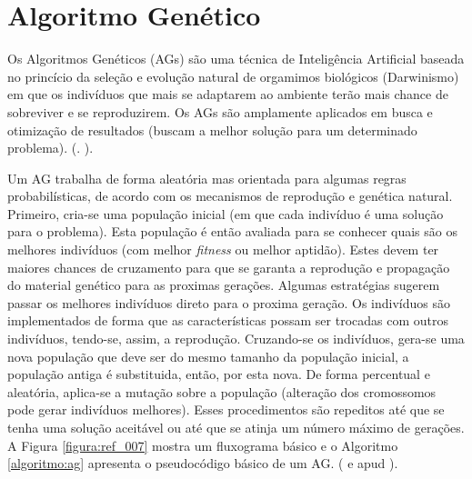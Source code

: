 \section{Algoritmo Genético}
\label{secao:AG}

Os Algoritmos Genéticos (AGs) são uma técnica de Inteligência Artificial baseada no princício da seleção e evolução natural de orgamimos biológicos (Darwinismo) em que os indivíduos que mais se adaptarem ao ambiente terão mais chance de sobreviver e se reproduzirem. Os AGs são amplamente aplicados em busca e otimização de resultados (buscam a melhor solução para um determinado problema). (\cite{pacheco:1999:algoritmos}. \cite{silva:2001:otimizacao}). 

Um AG trabalha de forma aleatória mas orientada para algumas regras probabilísticas, de acordo com os mecanismos de reprodução e genética natural. Primeiro, cria-se uma população inicial (em que cada indivíduo é uma solução para o problema). Esta população é então avaliada para se conhecer quais são os melhores indivíduos (com melhor \textit{fitness} ou melhor aptidão). Estes devem ter maiores chances de cruzamento para que se garanta a reprodução e propagação do material genético para as proximas gerações. Algumas estratégias sugerem passar os melhores indivíduos direto para o proxima geração. Os indivíduos são implementados de forma que as características possam ser trocadas com outros indivíduos, tendo-se, assim, a reprodução. Cruzando-se os indivíduos, gera-se uma nova população que deve ser do mesmo tamanho da população inicial, a população antiga é substituida, então, por esta nova. De forma percentual e aleatória, aplica-se a mutação sobre a população (alteração dos cromossomos pode gerar indivíduos melhores). Esses procedimentos são repeditos até que se tenha uma solução aceitável ou até que se atinja um número máximo de gerações. A Figura \ref{figura:ref_007} mostra um fluxograma básico e o Algoritmo \ref{algoritmo:ag} apresenta o pseudocódigo básico de um AG. (\cite{holland:1992:adaptation} e \cite{goldberg:1989:genetic} apud \cite{avila:2002:algoritmos}).

